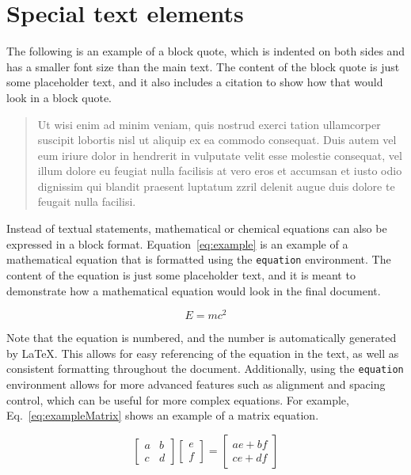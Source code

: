 \section{Special text elements}

The following is an example of a block quote, which is indented on both sides and has a smaller font size than the main text. The content of the block quote is just some placeholder text, and it also includes a citation to show how that would look in a block quote.

\begin{quote}
	Ut wisi enim ad minim veniam, quis nostrud exerci tation ullamcorper suscipit lobortis nisl ut aliquip ex ea commodo consequat. Duis autem vel eum iriure dolor in hendrerit in vulputate velit esse molestie consequat, vel illum dolore eu feugiat nulla facilisis at vero eros et accumsan et iusto odio dignissim qui blandit praesent luptatum zzril delenit augue duis dolore te feugait nulla facilisi. \cite{Example19} 
\end{quote}

Instead of textual statements, mathematical or chemical equations can also be expressed in a block format. Equation~\ref{eq:example} is an example of a mathematical equation that is formatted using the \texttt{equation} environment. The content of the equation is just some placeholder text, and it is meant to demonstrate how a mathematical equation would look in the final document.

\begin{equation}
	\label{eq:example}
	E = mc^2
\end{equation}

Note that the equation is numbered, and the number is automatically generated by LaTeX. This allows for easy referencing of the equation in the text, as well as consistent formatting throughout the document. Additionally, using the \texttt{equation} environment allows for more advanced features such as alignment and spacing control, which can be useful for more complex equations. For example, Eq.~\ref{eq:exampleMatrix} shows an example of a matrix equation.

\begin{equation}
	\label{eq:exampleMatrix}
	\begin{bmatrix}
		a & b \\
		c & d
	\end{bmatrix}
	\begin{bmatrix}
		e \\
		f
	\end{bmatrix}
	=
	\begin{bmatrix}
		ae + bf \\
		ce + df
	\end{bmatrix}
\end{equation}

